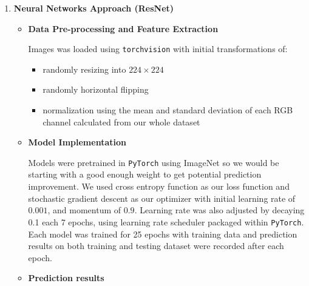 \documentclass[11.5pt]{article}
\begin{document}
\begin{enumerate}
\begin{itemize}
        \end{itemize}
        \item \textbf{Neural Networks Approach (ResNet)}
        \begin{itemize}
            \item \textbf{Data Pre-processing and Feature Extraction}

            Images was loaded using \texttt{torchvision} with initial transformations of:
            \begin{itemize}
                \item randomly resizing into $224 \times 224$
                \item randomly horizontal flipping
                \item normalization using the mean and standard deviation of each RGB channel calculated from our whole dataset
            \end{itemize}

            \item \textbf{Model Implementation}

            Models were pretrained in \texttt{PyTorch}\cite{pytorch} using ImageNet so we would be starting with a good enough weight to get potential prediction improvement.
            We used cross entropy function as our loss function and stochastic gradient descent as our optimizer with initial learning rate of $0.001$, and momentum of $0.9$.
            Learning rate was also adjusted by decaying 0.1 each 7 epochs, using learning rate scheduler packaged within \texttt{PyTorch}\cite{pytorch}.
            Each model was trained for 25 epochs with training data and prediction results on both training and testing dataset were recorded after each epoch.
            \item \textbf{Prediction results}


\end{itemize}
\end{enumerate}
\end{document}
